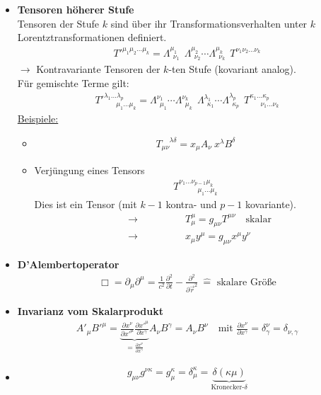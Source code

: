 \begin{itemize}
\item{\bf Tensoren höherer Stufe}\\
Tensoren der Stufe $k$ sind über ihr Transformationsverhalten unter $k$ Lorentztransformationen definiert.
\begin{eqnarray*}
{T'}^{\mu_1 \mu_2 \dots \mu_k} = \Lambda_{\ \ \nu_1}^{\mu_1} \ \ \Lambda_{\ \ \nu_2}^{\mu_2} \cdots \Lambda_{\ \ \nu_k}^{\mu_k}\ \ T^{\nu_1\nu_2\dots \nu_k} \end{eqnarray*}
$\longrightarrow$ Kontravariante Tensoren der $k$-ten Stufe (kovariant analog).\\ 
Für gemischte Terme gilt:
\begin{eqnarray*}
{T'}_{\ \ \ \  \ \ \ \ \mu_1 \dots\mu_k}^{\lambda_1 \dots \lambda_p} = \Lambda_{\ \ \mu_1}^{\nu_1} \cdots \Lambda_{\ \ \mu_k}^{\nu_k}\ \  \Lambda_{\ \ \kappa_1}^{\lambda_1}\cdots \Lambda_{\ \ \kappa_p}^{\lambda_p} \ \ T_{\ \ \ \ \ \ \ \nu_1 \dots\nu_k}^{\kappa_1 \dots \kappa_p}
\end{eqnarray*}
\underline{Beispiele:} \begin{itemize}
\item \begin{eqnarray*} T_{\mu\nu} ^{\ \ \ \ \ \lambda\delta}= x_{\mu}A_{\nu}\ x^{\lambda} B^{\delta}\end{eqnarray*}
\item Verjüngung eines Tensors \begin{eqnarray*} T_{\ \ \ \ \ \ \ \ \ \ \ \ \mu_1 \dots \mu_k}^{\nu_1 \dots \nu_{p-1} \mu_k}\end{eqnarray*}
Dies ist ein Tensor (mit $k-1$ kontra- und $p-1$ kovariante).
\begin{eqnarray*} &\rightarrow& \qquad  \qquad T_{\mu}^{\mu} = g_{\mu\nu} T^{\mu\nu} \quad \text{skalar} \\
&\rightarrow& \qquad\qquad x_{\mu}y^{\mu} = g_{\mu\nu}x^{\mu}y^{\nu} \end{eqnarray*}
\end{itemize}
\item{\bf D'Alembertoperator}
\begin{eqnarray*} 
\Box = \partial_{\mu} \partial^{\mu} = \frac 1 {c^2} \frac {\partial^2}{\partial t} - \frac{\partial ^2}{\partial \vec r^2} \ \widehat = \text{ skalare Größe}
\end{eqnarray*}
\item{\bf Invarianz vom Skalarprodukt}
\begin{eqnarray*} A'_{\mu} {B'}^{\mu} = \underbrace{\frac {\partial x^{\nu}}{\partial{x'}^{\mu}}\frac{\partial {x'}^{\mu}}{\partial x^{\gamma}}}_{= \frac{\partial x^{\nu}}{\partial x^{\gamma}}} A_{\nu}B^{\gamma} = A_{\nu}B^{\nu} \quad \text{mit } \frac{\partial x^{\nu}}{\partial x^{\gamma}} = \delta_{\gamma}^{\nu} = \delta_{\nu,\gamma}
\end{eqnarray*}
\item \begin{eqnarray*} g_{\mu\nu}g^{\nu\kappa} = g_{\mu}^{\kappa} = \delta_{\mu}^{\kappa} = \underbrace{\delta{(\kappa \mu)}}_{\text{Kronecker-}\delta}\end{eqnarray*}
\end{itemize}
